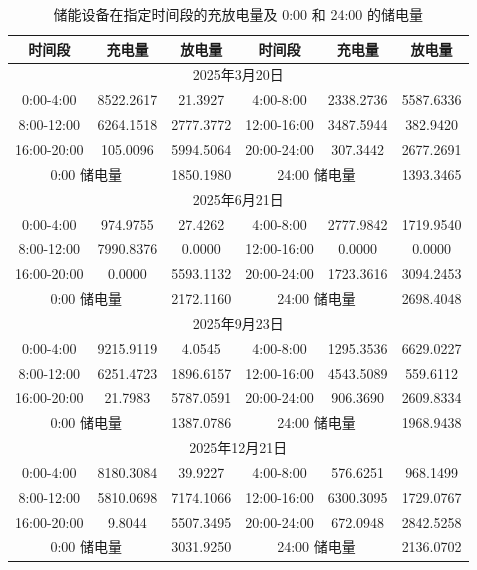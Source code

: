 \documentclass[withoutpreface,bwprint]{cumcmthesis}
\begin{document}
\begin{table}[h!]
	\centering
	\footnotesize
	\renewcommand{\arraystretch}{1.2}
	\setlength{\tabcolsep}{15pt}
	\caption{储能设备在指定时间段的充放电量及 0:00 和 24:00 的储电量}
	\label{tab:q42_spec_2}
	\begin{tabular}{|c|c|c|c|c|c|}
		\hline
		时间段 & 充电量 & 放电量 & 时间段 & 充电量 & 放电量 \\ \hline
		\multicolumn{6}{|c|}{2025年3月20日} \\ \hline
		0:00-4:00 & 8522.2617 & 21.3927 & 4:00-8:00 & 2338.2736 & 5587.6336 \\ \hline
		8:00-12:00 & 6264.1518 & 2777.3772 & 12:00-16:00 & 3487.5944 & 382.9420 \\ \hline
		16:00-20:00 & 105.0096 & 5994.5064 & 20:00-24:00 & 307.3442 & 2677.2691 \\ \hline
		\multicolumn{2}{|c|}{0:00 储电量} & 1850.1980 & \multicolumn{2}{c|}{24:00 储电量} & 1393.3465 \\ \hline
		\multicolumn{6}{|c|}{2025年6月21日} \\ \hline
		0:00-4:00 & 974.9755 & 27.4262 & 4:00-8:00 & 2777.9842 & 1719.9540 \\ \hline
		8:00-12:00 & 7990.8376 & 0.0000 & 12:00-16:00 & 0.0000 & 0.0000 \\ \hline
		16:00-20:00 & 0.0000 & 5593.1132 & 20:00-24:00 & 1723.3616 & 3094.2453 \\ \hline
		\multicolumn{2}{|c|}{0:00 储电量} & 2172.1160 & \multicolumn{2}{c|}{24:00 储电量} & 2698.4048 \\ \hline
		\multicolumn{6}{|c|}{2025年9月23日} \\ \hline
		0:00-4:00 & 9215.9119 & 4.0545 & 4:00-8:00 & 1295.3536 & 6629.0227 \\ \hline
		8:00-12:00 & 6251.4723 & 1896.6157 & 12:00-16:00 & 4543.5089 & 559.6112 \\ \hline
		16:00-20:00 & 21.7983 & 5787.0591 & 20:00-24:00 & 906.3690 & 2609.8334 \\ \hline
		\multicolumn{2}{|c|}{0:00 储电量} & 1387.0786 & \multicolumn{2}{c|}{24:00 储电量} & 1968.9438 \\ \hline
		\multicolumn{6}{|c|}{2025年12月21日} \\ \hline
		0:00-4:00 & 8180.3084 & 39.9227 & 4:00-8:00 & 576.6251 & 968.1499 \\ \hline
		8:00-12:00 & 5810.0698 & 7174.1066 & 12:00-16:00 & 6300.3095 & 1729.0767 \\ \hline
		16:00-20:00 & 9.8044 & 5507.3495 & 20:00-24:00 & 672.0948 & 2842.5258 \\ \hline
		\multicolumn{2}{|c|}{0:00 储电量} & 3031.9250 & \multicolumn{2}{c|}{24:00 储电量} & 2136.0702 \\ \hline
	\end{tabular}
\end{table}
\end{document}

